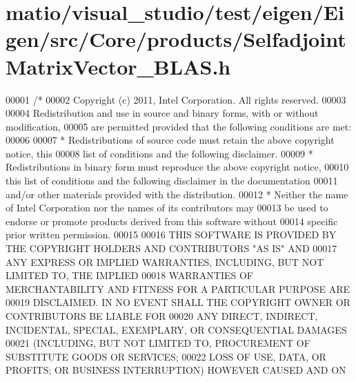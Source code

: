 \hypertarget{matio_2visual__studio_2test_2eigen_2_eigen_2src_2_core_2products_2_selfadjoint_matrix_vector___b_l_a_s_8h_source}{}\section{matio/visual\+\_\+studio/test/eigen/\+Eigen/src/\+Core/products/\+Selfadjoint\+Matrix\+Vector\+\_\+\+B\+L\+AS.h}
\label{matio_2visual__studio_2test_2eigen_2_eigen_2src_2_core_2products_2_selfadjoint_matrix_vector___b_l_a_s_8h_source}

\begin{DoxyCode}
00001 \textcolor{comment}{/*}
00002 \textcolor{comment}{ Copyright (c) 2011, Intel Corporation. All rights reserved.}
00003 \textcolor{comment}{}
00004 \textcolor{comment}{ Redistribution and use in source and binary forms, with or without modification,}
00005 \textcolor{comment}{ are permitted provided that the following conditions are met:}
00006 \textcolor{comment}{}
00007 \textcolor{comment}{ * Redistributions of source code must retain the above copyright notice, this}
00008 \textcolor{comment}{   list of conditions and the following disclaimer.}
00009 \textcolor{comment}{ * Redistributions in binary form must reproduce the above copyright notice,}
00010 \textcolor{comment}{   this list of conditions and the following disclaimer in the documentation}
00011 \textcolor{comment}{   and/or other materials provided with the distribution.}
00012 \textcolor{comment}{ * Neither the name of Intel Corporation nor the names of its contributors may}
00013 \textcolor{comment}{   be used to endorse or promote products derived from this software without}
00014 \textcolor{comment}{   specific prior written permission.}
00015 \textcolor{comment}{}
00016 \textcolor{comment}{ THIS SOFTWARE IS PROVIDED BY THE COPYRIGHT HOLDERS AND CONTRIBUTORS "AS IS" AND}
00017 \textcolor{comment}{ ANY EXPRESS OR IMPLIED WARRANTIES, INCLUDING, BUT NOT LIMITED TO, THE IMPLIED}
00018 \textcolor{comment}{ WARRANTIES OF MERCHANTABILITY AND FITNESS FOR A PARTICULAR PURPOSE ARE}
00019 \textcolor{comment}{ DISCLAIMED. IN NO EVENT SHALL THE COPYRIGHT OWNER OR CONTRIBUTORS BE LIABLE FOR}
00020 \textcolor{comment}{ ANY DIRECT, INDIRECT, INCIDENTAL, SPECIAL, EXEMPLARY, OR CONSEQUENTIAL DAMAGES}
00021 \textcolor{comment}{ (INCLUDING, BUT NOT LIMITED TO, PROCUREMENT OF SUBSTITUTE GOODS OR SERVICES;}
00022 \textcolor{comment}{ LOSS OF USE, DATA, OR PROFITS; OR BUSINESS INTERRUPTION) HOWEVER CAUSED AND ON}

\end{DoxyCode}
